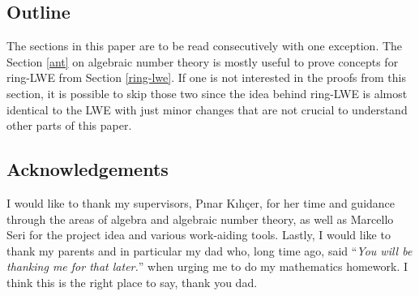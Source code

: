 
\subsection{Outline}
The sections in this paper are to be read consecutively with one exception. The Section \ref{ant} on algebraic number theory is mostly useful to prove concepts for ring-LWE from Section \ref{ring-lwe}. If one is not interested in the proofs from this section, it is possible to skip those two since the idea behind ring-LWE is almost identical to the LWE with just minor changes that are not crucial to understand other parts of this paper.

\subsection*{Acknowledgements}
I would like to thank my supervisors, Pınar Kılıçer, for her time and guidance through the areas of algebra and algebraic number theory, as well as Marcello Seri for the project idea and various work-aiding tools. Lastly, I would like to thank my parents and in particular my dad who, long time ago, said ``\textit{You will be thanking me for that later.}'' when urging me to do my mathematics homework. I think this is the right place to say, thank you dad.
